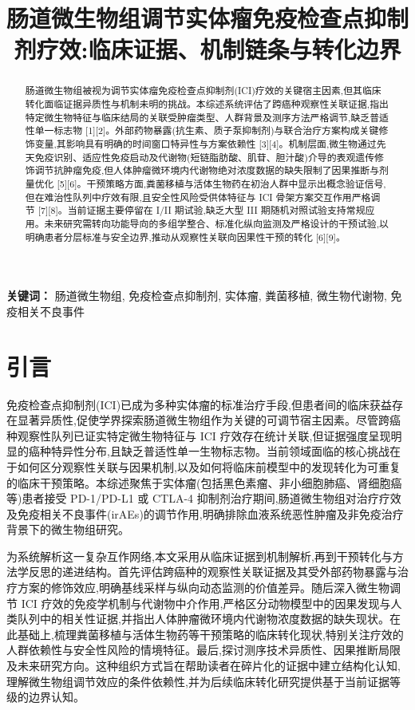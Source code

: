 \documentclass[11pt]{article}
\title{肠道微生物组调节实体瘤免疫检查点抑制剂疗效:临床证据、机制链条与转化边界}
\author{}
\date{}
\begin{document}
\maketitle

\begin{abstract}
肠道微生物组被视为调节实体瘤免疫检查点抑制剂(ICI)疗效的关键宿主因素,但其临床转化面临证据异质性与机制未明的挑战。本综述系统评估了跨癌种观察性关联证据,指出特定微生物特征与临床结局的关联受肿瘤类型、人群背景及测序方法严格调节,缺乏普适性单一标志物 [1][2]。外部药物暴露(抗生素、质子泵抑制剂)与联合治疗方案构成关键修饰变量,其影响具有明确的时间窗口特异性与方案依赖性 [3][4]。机制层面,微生物通过先天免疫识别、适应性免疫启动及代谢物(短链脂肪酸、肌苷、胆汁酸)介导的表观遗传修饰调节抗肿瘤免疫,但人体肿瘤微环境内代谢物绝对浓度数据的缺失限制了因果推断与剂量优化 [5][6]。干预策略方面,粪菌移植与活体生物药在初治人群中显示出概念验证信号,但在难治性队列中疗效有限,且安全性风险受供体特征与 ICI 骨架方案交互作用严格调节 [7][8]。当前证据主要停留在 I/II 期试验,缺乏大型 III 期随机对照试验支持常规应用。未来研究需转向功能导向的多组学整合、标准化纵向监测及严格设计的干预试验,以明确患者分层标准与安全边界,推动从观察性关联向因果性干预的转化 [6][9]。
\end{abstract}

\noindent\textbf{关键词：} 肠道微生物组, 免疫检查点抑制剂, 实体瘤, 粪菌移植, 微生物代谢物, 免疫相关不良事件

\section{引言}\label{ux5f15ux8a00}

免疫检查点抑制剂(ICI)已成为多种实体瘤的标准治疗手段,但患者间的临床获益存在显著异质性,促使学界探索肠道微生物组作为关键的可调节宿主因素。尽管跨癌种观察性队列已证实特定微生物特征与 ICI 疗效存在统计关联,但证据强度呈现明显的癌种特异性分布,且缺乏普适性单一生物标志物。当前领域面临的核心挑战在于如何区分观察性关联与因果机制,以及如何将临床前模型中的发现转化为可重复的临床干预策略。本综述聚焦于实体瘤(包括黑色素瘤、非小细胞肺癌、肾细胞癌等)患者接受 PD-1/PD-L1 或 CTLA-4 抑制剂治疗期间,肠道微生物组对治疗疗效及免疫相关不良事件(irAEs)的调节作用,明确排除血液系统恶性肿瘤及非免疫治疗背景下的微生物组研究。

为系统解析这一复杂互作网络,本文采用从临床证据到机制解析,再到干预转化与方法学反思的递进结构。首先评估跨癌种的观察性关联证据及其受外部药物暴露与治疗方案的修饰效应,明确基线采样与纵向动态监测的价值差异。随后深入微生物调节 ICI 疗效的免疫学机制与代谢物中介作用,严格区分动物模型中的因果发现与人类队列中的相关性证据,并指出人体肿瘤微环境内代谢物浓度数据的缺失现状。在此基础上,梳理粪菌移植与活体生物药等干预策略的临床转化现状,特别关注疗效的人群依赖性与安全性风险的情境特征。最后,探讨测序技术异质性、因果推断局限及未来研究方向。这种组织方式旨在帮助读者在碎片化的证据中建立结构化认知,理解微生物组调节效应的条件依赖性,并为后续临床转化研究提供基于当前证据等级的边界认知。
\end{document}
